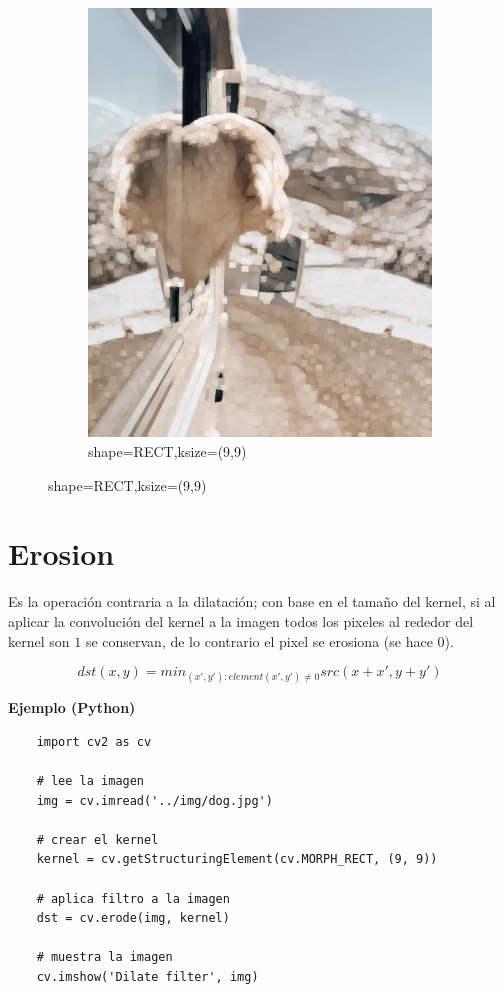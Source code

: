 \documentclass[a4paper, 12pt]{article}
\begin{document}
\begin{figure}[!ht]
\begin{subfigure}{0.4\textwidth}
        \includegraphics[width=\textwidth]{img/dog-dilate.png}
        \caption{shape=RECT,ksize=(9,9)}
    \end{subfigure}
\end{figure}

\section{Erosion}
Es la operación contraria a la dilatación; con base en el tamaño del kernel, si al aplicar la convolución del kernel a la imagen todos los pixeles al rededor del kernel son $1$ se conservan, de lo contrario el pixel se erosiona (se hace $0$).

\begin{equation}
    dst(x,y)=min_{(x',y'):element(x',y')\neq 0}src(x+x',y+y')
\end{equation}

\textbf{Ejemplo (Python)}
\begin{lstlisting}
    import cv2 as cv

    # lee la imagen
    img = cv.imread('../img/dog.jpg')

    # crear el kernel
    kernel = cv.getStructuringElement(cv.MORPH_RECT, (9, 9))

    # aplica filtro a la imagen
    dst = cv.erode(img, kernel)

    # muestra la imagen
    cv.imshow('Dilate filter', img)
\end{lstlisting}
\end{document}
